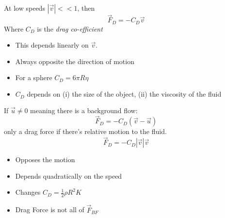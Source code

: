 \documentclass[twoside]{scrartcl}
\begin{document}
At low speeds $|\vec{v}| << 1$, then 
\[\vec{F}_D = -C_D\vec{v}\]
Where $C_D$ is the \emph{drag co-efficient}

\begin{itemize}
\item This depends linearly on $\vec{v}$.
\item Always opposite the direction of motion
\item For a sphere $C_D = 6\pi R\eta$
\item $C_D$ depends on (i) the size of the object, (ii) the viscosity of the fluid
\end{itemize}
If $\vec{u} \neq 0$ meaning there is a background flow:
\[\vec{F}_D = -C_D(\vec{v} - \vec{u})\]
only a drag force if there's relative motion to the fluid.\\

\[\vec{F}_D = -C_D|\vec{v}|\vec{v}\]
\begin{itemize}
\item Opposes the motion
\item Depends quadratically on the speed
\item Changes $C_D = \frac{1}{2}\rho R^2K$
\item Drag Force is not all of $\vec{F}_{BF}$
\begin{center}
	
\end{center}
\end{itemize}
\end{document}
